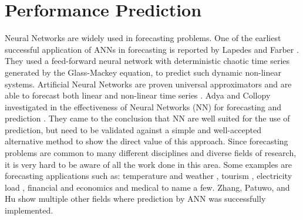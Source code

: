 \section{Performance Prediction}
Neural Networks are widely used in forecasting problems. One of the earliest successful application of ANNs in forecasting is reported by Lapedes and Farber \cite{LapedesFarber87}. They used a feed-forward neural network with deterministic chaotic time series generated by the Glass-Mackey equation, to predict such dynamic non-linear systems.
Artificial Neural Networks are proven universal approximators \cite{Hornik1989359}\cite{Hornik1991251} and are able to forecast both linear \cite{Zhang20011183} and non-linear time series \cite{Zhang199835}. Adya and Collopy investigated in the effectiveness of Neural Networks (NN) for forecasting and prediction \cite{neural1}. They came to the conclusion that NN are well suited for the use of prediction, but need to be validated against a simple and well-accepted alternative method to show the direct value of this approach. Since forecasting problems are common to many different disciplines and diverse fields of research, it is very hard to be aware of all the work done in this area.  Some examples are forecasting applications such as: temperature and weather \cite{Langella2010328}\cite{Buizza}\cite{Roebber}, tourism \cite{Pattie1996151}, electricity load \cite{Park76685}\cite{Hippert910780}, financial and economics \cite{Bodyanskiy20061357}\cite{McAdam2005848}\cite{Kaastra1996215}\cite{Guresen201110389} and medical \cite{Vukicevic2014}\cite{Arizmendi20145296} to name a few. Zhang, Patuwo, and Hu \cite{Zhang199835} show multiple other fields where prediction by ANN was successfully implemented.


